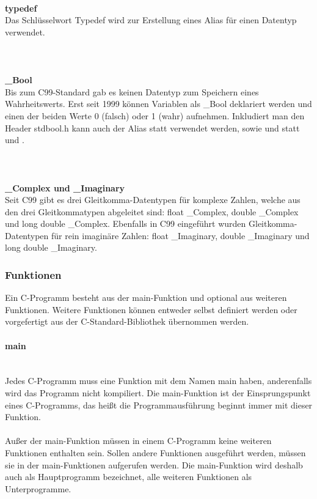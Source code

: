 \ \\
\textbf{typedef}\\
Das Schlüsselwort Typedef wird zur Erstellung eines Alias für einen Datentyp verwendet.\\
\ \\
\\
\ \\
\textbf{\_Bool}\\
Bis zum C99-Standard gab es keinen Datentyp zum Speichern eines Wahrheitswerts. Erst seit 1999 können Variablen als \_Bool deklariert werden und einen der beiden Werte 0 (falsch) oder 1 (wahr) aufnehmen. Inkludiert man den Header stdbool.h kann auch der Alias  statt  verwendet werden, sowie  und  statt  und .\\
\ \\
\\
\ \\
\textbf{\_Complex und \_Imaginary}\\
Seit C99 gibt es drei Gleitkomma-Datentypen für komplexe Zahlen, welche aus den drei Gleitkommatypen abgeleitet sind: float \_Complex, double \_Complex und long double \_Complex. Ebenfalls in C99 eingeführt wurden Gleitkomma-Datentypen für rein imaginäre Zahlen: float \_Imaginary, double \_Imaginary und long double \_Imaginary.\\

\subsubsection{Funktionen}

Ein C-Programm besteht aus der main-Funktion und optional aus weiteren Funktionen. Weitere Funktionen können entweder selbst definiert werden oder vorgefertigt aus der C-Standard-Bibliothek übernommen werden.

\paragraph{main}
\ \\
Jedes C-Programm muss eine Funktion mit dem Namen main haben, anderenfalls wird das Programm nicht kompiliert. Die main-Funktion ist der Einsprungspunkt eines C-Programms, das heißt die Programmausführung beginnt immer mit dieser Funktion.\\
\\
Außer der main-Funktion müssen in einem C-Programm keine weiteren Funktionen enthalten sein. Sollen andere Funktionen ausgeführt werden, müssen sie in der main-Funktionen aufgerufen werden. Die main-Funktion wird deshalb auch als Hauptprogramm bezeichnet, alle weiteren Funktionen als Unterprogramme.
